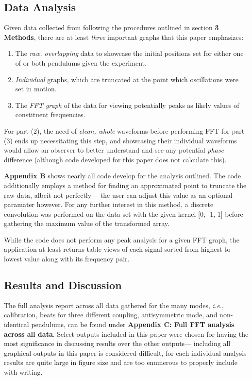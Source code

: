 \documentclass[12pt]{article}
\begin{document}
\begin{multicols}{2}
\subsection{Data Analysis}
Given data collected from following the procedures outlined in section \textbf{3 Methods}, there are at least \textit{three} important graphs that this paper emphasizes:
\begin{enumerate}
    \item The \textit{raw, overlapping} data to showcase the initial positions set for either one of or both pendulums given the experiment.
    \item \textit{Individual} graphs, which are truncated at the point which oscillations were set in motion.
    \item The \textit{FFT graph} of the data for viewing potentially peaks as likely values of constituent frequencies.
\end{enumerate}
For part (2), the need of \textit{clean, whole} waveforms before performing FFT for part (3) ends up necessitating this step,
and showcasing their individual waveforms would allow an observer to better understand and see any potential \textit{phase} difference
(although code developed for this paper does not calculate this).

\textbf{Appendix B} shows nearly all code develop for the analysis outlined.
The code additionally employs a method for finding an approximated point to truncate the raw data,
albeit not perfectly--- the user can adjust this value as an optional paramater however.
For any further interest in this method, 
a discrete convolution was performed on the data set with the given kernel [0, -1, 1] before gathering the maximum value of the transformed array.

While the code does not perform any peak analysis for a given FFT graph,
the application at least returns table views of each signal sorted from highest to lowest value along with its frequency pair.


\subsection{Results and Discussion}
The full analysis report across all data gathered for the many modes, \textit{i.e.}, calibration, beats for three different coupling, antisymmetric mode, and non-identical pendulums,
can be found under \textbf{Appendix C: Full FFT analysis across all data}.
Select outputs included in this paper were chosen for having the most significance in discussing results over the other outputs---
including all graphical outputs in this paper is considered difficult, for each individual analysis results are quite large in figure size and are too enumerous to properly include with writing.


\end{multicols}
\end{document}
